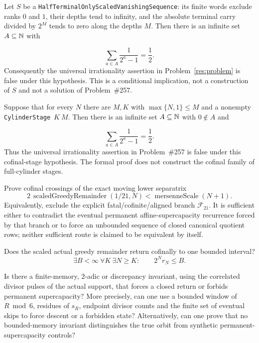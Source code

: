 \documentclass[11pt]{article}
\begin{document}
\begin{theorem}
\label{res:terminalhalf}
Let $S$ be a
\texttt{HalfTerminalOnlyScaledVanishingSequence}: its finite words exclude
ranks $0$ and $1$, their depths tend to infinity, and the absolute terminal
carry divided by $2^M$ tends to zero along the depths $M$.  Then there is an
infinite set $A\subseteq\mathbb{N}$ with

\[
  \sum_{a\in A}\frac1{2^a-1}=\frac12.
\]
Consequently the universal irrationality assertion in
Problem~\ref{res:problem} is false under this hypothesis.  This is a
conditional implication, not a construction of $S$ and not a solution
of Problem~\#257.
\end{theorem}

\begin{theorem}
\label{res:cylinderhalf}
Suppose that for every $N$ there are $M,K$ with
$\max\{N,1\}\le M$ and a nonempty
\texttt{CylinderStage}~$K~M$.  Then there is an infinite set
$A\subseteq\mathbb{N}$ with $0\notin A$ and

\[
  \sum_{a\in A}\frac{1}{2^a-1}=\frac12.
\]
Thus the universal irrationality assertion in Problem~\#257 is false under
this cofinal-stage hypothesis.  The formal proof does not construct the
cofinal family of full-cylinder stages.
\end{theorem}

\begin{problem}
\label{prob:one-over-twenty-one-membership}
Prove cofinal crossings of the exact moving lower separatrix
\[
 2\,\operatorname{scaledGreedyRemainder}(1/21,N)
 <\operatorname{mersenneScale}(N+1).
\]
Equivalently, exclude the explicit fatal/cofinite/aligned branch $\mathcal F_{21}$.
It is sufficient either to contradict the eventual permanent
affine-supercapacity recurrence forced by that branch or to force an unbounded
sequence of closed canonical quotient rows; neither sufficient route is
claimed to be equivalent by itself.
\end{problem}

\begin{problem}\label{prob:scaled-return}
Does the scaled actual greedy remainder return cofinally to one bounded
interval?
\[
 \exists B<\infty\ \forall K\ \exists N\ge K:
 \qquad 2^N r_N\le B.
\]
\end{problem}

\begin{problem}\label{prob:actual-invariant}
Is there a finite-memory, $2$-adic or discrepancy invariant, using the
correlated divisor pulses of the actual support, that forces a closed return
or forbids permanent supercapacity?  More precisely, can one use a bounded
window of $R\bmod6$, residues of $s_R$, endpoint divisor counts and the finite
set of eventual skips to force descent or a forbidden state?  Alternatively,
can one prove that no bounded-memory invariant distinguishes the true orbit
from synthetic permanent-supercapacity controls?
\end{problem}
\end{document}

